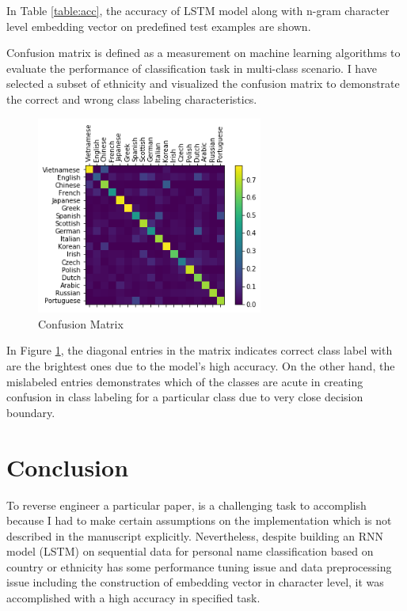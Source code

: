 \documentclass[a4paper]{article}
\begin{document}
In Table \ref{table:acc}, the accuracy of LSTM model along with n-gram character level embedding vector on predefined test examples are shown.

Confusion matrix is defined as a measurement on machine learning algorithms to evaluate the performance of classification task in multi-class scenario. I have selected a subset of ethnicity and visualized the confusion matrix to demonstrate the correct and wrong class labeling characteristics.
\\

\begin{figure}[t!]
	\centering
	\includegraphics[width = 0.5\columnwidth, height = 6.5cm]{confusion.png}
	\caption{Confusion Matrix}
	\label{fig:conf_mat}
\end{figure}

In Figure \ref{fig:conf_mat}, the diagonal entries in the matrix indicates correct class label with are the brightest ones due to the model's high accuracy. On the other hand, the mislabeled entries demonstrates which of the classes are acute in creating confusion in class labeling for a particular class due to very close decision boundary.

\section*{Conclusion}
To reverse engineer a particular paper, is a challenging task to accomplish because I had to make certain assumptions on the implementation which is not described in the manuscript explicitly. Nevertheless, despite building an RNN model (LSTM) on sequential data for personal name classification based on country or ethnicity has some performance tuning issue and data preprocessing issue including the construction of embedding vector in character level, it was accomplished with a high accuracy in specified task.

 

\end{document}
